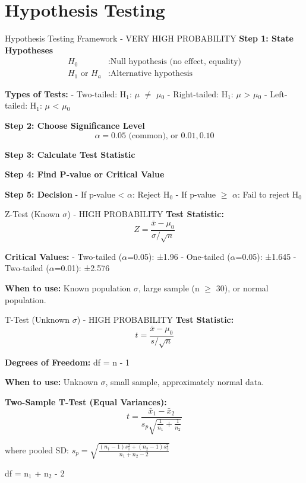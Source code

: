 \documentclass[11pt]{article}
\begin{document}
\section{Hypothesis Testing}

\begin{important}{Hypothesis Testing Framework - VERY HIGH PROBABILITY}
\textbf{Step 1: State Hypotheses}
\begin{align*}
H_0&: \text{Null hypothesis (no effect, equality)} \\
H_1 \text{ or } H_a&: \text{Alternative hypothesis}
\end{align*}

\textbf{Types of Tests:}
- Two-tailed: H$_1$: $\mu$ $\neq$ $\mu$$_0$
- Right-tailed: H$_1$: $\mu$ > $\mu$$_0$
- Left-tailed: H$_1$: $\mu$ < $\mu$$_0$

\textbf{Step 2: Choose Significance Level}
\[\alpha = 0.05 \text{ (common), or } 0.01, 0.10\]

\textbf{Step 3: Calculate Test Statistic}

\textbf{Step 4: Find P-value or Critical Value}

\textbf{Step 5: Decision}
- If p-value < $\alpha$: Reject H$_0$
- If p-value $\geq$ $\alpha$: Fail to reject H$_0$
\end{important}

\begin{important}{Z-Test (Known $\sigma$) - HIGH PROBABILITY}
\textbf{Test Statistic:}
\[Z = \frac{\bar{x} - \mu_0}{\sigma/\sqrt{n}}\]

\textbf{Critical Values:}
- Two-tailed ($\alpha$=0.05): ±1.96
- One-tailed ($\alpha$=0.05): ±1.645
- Two-tailed ($\alpha$=0.01): ±2.576

\textbf{When to use:} Known population $\sigma$, large sample (n $\geq$ 30), or normal population.
\end{important}

\begin{important}{T-Test (Unknown $\sigma$) - HIGH PROBABILITY}
\textbf{Test Statistic:}
\[t = \frac{\bar{x} - \mu_0}{s/\sqrt{n}}\]

\textbf{Degrees of Freedom:} df = n - 1

\textbf{When to use:} Unknown $\sigma$, small sample, approximately normal data.

\textbf{Two-Sample T-Test (Equal Variances):}
\[t = \frac{\bar{x}_1 - \bar{x}_2}{s_p\sqrt{\frac{1}{n_1} + \frac{1}{n_2}}}\]

where pooled SD: \(s_p = \sqrt{\frac{(n_1-1)s_1^2 + (n_2-1)s_2^2}{n_1+n_2-2}}\)

df = n$_1$ + n$_2$ - 2
\end{important}
\end{document}
